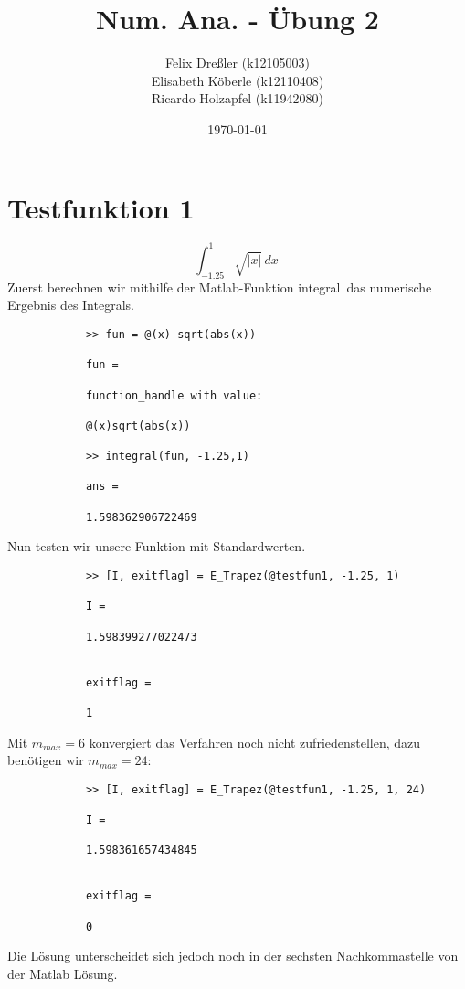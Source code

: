 \documentclass[11pt,titlepage]{article}
\title{Num. Ana. - Übung 2}
\author{Felix Dreßler (k12105003) \\ Elisabeth Köberle (k12110408) \\ Ricardo Holzapfel (k11942080)}
\date{\today} %
\begin{document}
\maketitle

	\section{Testfunktion 1}
		\begin{displaymath}
			\int_{-1.25}^1 \sqrt{|x|} \, dx\
		\end{displaymath}
		Zuerst berechnen wir mithilfe der Matlab-Funktion \glqq integral\grqq \, das numerische Ergebnis des Integrals.
		\begin{lstlisting}
			>> fun = @(x) sqrt(abs(x))
			
			fun =
			
			function_handle with value:
			
			@(x)sqrt(abs(x))
			
			>> integral(fun, -1.25,1)
			
			ans =
			
			1.598362906722469
		\end{lstlisting}
		Nun testen wir unsere Funktion mit Standardwerten.
		\begin{lstlisting}
			>> [I, exitflag] = E_Trapez(@testfun1, -1.25, 1)
			
			I =
			
			1.598399277022473
			
			
			exitflag =
			
			1
		\end{lstlisting}
		Mit $m_{max} = 6$ konvergiert das Verfahren noch nicht zufriedenstellen, dazu benötigen wir $m_{max} = 24$:
		\begin{lstlisting}
			>> [I, exitflag] = E_Trapez(@testfun1, -1.25, 1, 24)
			
			I =
			
			1.598361657434845
			
			
			exitflag =
			
			0
		\end{lstlisting}
		Die Lösung unterscheidet sich jedoch noch in der sechsten Nachkommastelle von der Matlab Lösung.
		
\end{document}
